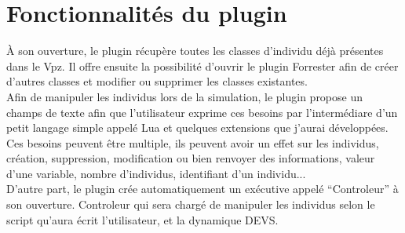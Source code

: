 \section{Fonctionnalités du plugin}
À son ouverture, le plugin récupère toutes les classes d'individu déjà présentes dans le Vpz. Il offre ensuite la possibilité d'ouvrir le plugin Forrester afin de créer d'autres classes et modifier ou supprimer les classes existantes.\\
Afin de manipuler les individus lors de la simulation, le plugin propose un champs de texte afin que l'utilisateur exprime ces besoins par l'intermédiare d'un petit langage simple appelé Lua et quelques extensions que j'aurai développées.\\
Ces besoins peuvent être multiple, ils peuvent avoir un effet sur les individus, création, suppression, modification ou bien renvoyer des informations, valeur d'une variable, nombre d'individus, identifiant d'un individu...\\
D'autre part, le plugin crée automatiquement un exécutive appelé ``Controleur'' à son ouverture. Controleur qui sera chargé de manipuler les individus selon le script qu'aura écrit l'utilisateur, et la dynamique DEVS.\\